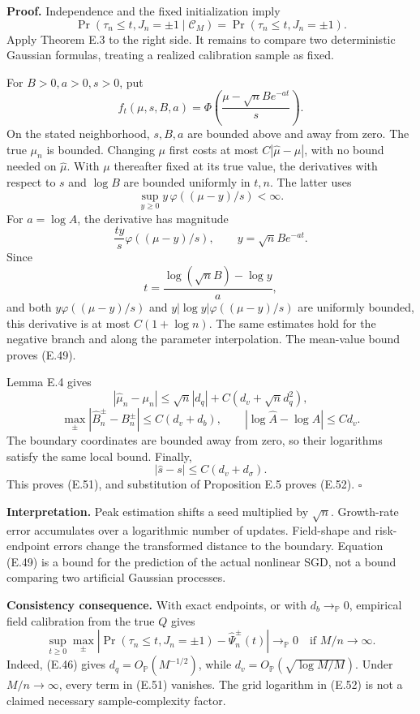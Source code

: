 \textbf{Proof.} Independence and the fixed initialization imply \[
\Pr(\tau_n\le t,J_n=\pm1\mid\mathcal C_M)
=\Pr(\tau_n\le t,J_n=\pm1).
\tag{E.53}
\] Apply Theorem E.3 to the right side. It remains to compare two
deterministic Gaussian formulas, treating a realized calibration sample
as fixed.

For \(B>0,a>0,s>0\), put \[
f_t(\mu,s,B,a)
=\Phi\!\left(\frac{\mu-\sqrt n B e^{-at}}s\right).
\] On the stated neighborhood, \(s,B,a\) are bounded above and away from
zero. The true \(\mu_n\) is bounded. Changing \(\mu\) first costs at
most \(C|\widehat\mu-\mu|\), with no bound needed on \(\widehat\mu\).
With \(\mu\) thereafter fixed at its true value, the derivatives with
respect to \(s\) and \(\log B\) are bounded uniformly in \(t,n\). The
latter uses \[
\sup_{y\ge0} y\,\varphi((\mu-y)/s)<\infty.
\] For \(a=\log A\), the derivative has magnitude \[
\frac{t y}{s}\varphi((\mu-y)/s),
\qquad y=\sqrt n B e^{-at}.
\] Since \[
t=\frac{\log(\sqrt n B)-\log y}{a},
\] and both \(y\varphi((\mu-y)/s)\) and \(y|\log y|\varphi((\mu-y)/s)\)
are uniformly bounded, this derivative is at most \(C(1+\log n)\). The
same estimates hold for the negative branch and along the parameter
interpolation. The mean-value bound proves (E.49).

Lemma E.4 gives \[
|\widehat\mu_n-\mu_n|
\le\sqrt n|d_q|+C(d_v+\sqrt n d_q^2),
\] \[
\max_\pm|\widehat B_n^\pm-B_n^\pm|\le C(d_v+d_b),
\qquad |\log\widehat A-\log A|\le Cd_v.
\] The boundary coordinates are bounded away from zero, so their
logarithms satisfy the same local bound. Finally, \[
|\widehat s-s|\le C(d_v+d_\sigma).
\] This proves (E.51), and substitution of Proposition E.5 proves
(E.52). \(\square\)

\textbf{Interpretation.} Peak estimation shifts a seed multiplied by
\(\sqrt n\). Growth-rate error accumulates over a logarithmic number of
updates. Field-shape and risk-endpoint errors change the transformed
distance to the boundary. Equation (E.49) is a bound for the prediction
of the actual nonlinear SGD, not a bound comparing two artificial
Gaussian processes.

\textbf{Consistency consequence.} With exact endpoints, or with
\(d_b\to_{\mathbb P}0\), empirical field calibration from the true \(Q\)
gives \[
\sup_{t\ge0}\max_\pm
\left|\Pr(\tau_n\le t,J_n=\pm1)-\widehat\Psi_n^\pm(t)\right|
\to_{\mathbb P}0
\quad\text{if }M/n\to\infty.
\tag{E.54}
\] Indeed, (E.46) gives \(d_q=O_{\mathbb P}(M^{-1/2})\), while
\(d_v=O_{\mathbb P}(\sqrt{\log M/M})\). Under \(M/n\to\infty\), every
term in (E.51) vanishes. The grid logarithm in (E.52) is not a claimed
necessary sample-complexity factor.

